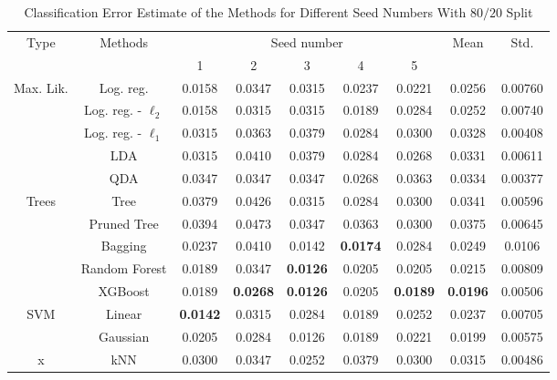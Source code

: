 \begin{table}[htb]
	\caption{Classification Error Estimate of the Methods for Different Seed Numbers With $80/20$ Split}
	\begin{center}
		\begin{tabular}{@{} c c c  c c c c c c @{}}\toprule
			\multirow{2}{*}{Type} & \multirow{2}{*}{Methods} &  \multicolumn{5}{c}{Seed number}
			& 	\multirow{2}{*}{Mean} & \multirow{2}{*}{Std.} \\
			& & 1 & 2 & 3 & 4 & 5 & & \\
			\midrule
			\multirow{5}{*}{Max. Lik.} & Log. reg. & \num{0.0158} & \num{0.0347} & \num{0.0315} & \num{0.0237} & \num{0.0221} & \num{0.0256} & \num{0.00760} \\
			& Log. reg. - $\ell_2$ & \num{0.0158} & \num{0.0315} & \num{0.0315} & \num{0.0189} & \num{0.0284} & \num{0.0252} & \num{0.00740}\\
			& Log. reg. - $\ell_1$ & \num{0.0315} & \num{0.0363} & \num{0.0379} & \num{0.0284} & \num{0.0300} & \num{0.0328} & \num{0.00408}\\
			& LDA & \num{0.0315} & \num{0.0410} & \num{0.0379} & \num{0.0284} & \num{0.0268} & \num{0.0331} & \num{0.00611}\\
			& QDA & \num{0.0347} & \num{0.0347} & \num{0.0347} & \num{0.0268} & \num{0.0363} & \num{0.0334} & \num{0.00377}\\
			\cmidrule{1-9}
			\multirow{5}{*}{Trees} & Tree & \num{0.0379} & \num{0.0426} & \num{0.0315} & \num{0.0284} & \num{0.0300} &  \num{0.0341} & \num{0.00596}\\
			& Pruned Tree & \num{0.0394} & \num{0.0473} & \num{0.0347} & \num{0.0363} & \num{0.0300} & \num{0.0375} & \num{0.00645}\\  
			& Bagging & \num{0.0237} & \num{0.0410} & \num{0.0142} & \textbf{\num{0.0174}} & \num{0.0284} & \num{0.0249} & \num{0.0106}\\
			& Random Forest & \num{0.0189} & \num{0.0347} & \textbf{\num{0.0126}} & \num{0.0205} & \num{0.0205} & \num{0.0215}  & \num{0.00809}\\
			& XGBoost & \num{0.0189} & \textbf{\num{0.0268}} & \textbf{\num{0.0126}} & \num{0.0205} & \textbf{\num{0.0189}} & \textbf{\num{0.0196}}  & \num{0.00506}\\
			\cmidrule{1-9}
			\multirow{2}{*}{SVM} & Linear & \textbf{\num{0.0142}} & \num{0.0315} & \num{0.0284} & \num{0.0189} & \num{0.0252} & \num{0.0237}  & \num{0.00705}\\
			& Gaussian & \num{0.0205} & \num{0.0284} & \num{0.0126} & \num{0.0189} & \num{0.0221} & \num{0.0199} & \num{0.00575}\\
			\cmidrule{1-9}
			x & kNN & \num{0.0300} & \num{0.0347} & \num{0.0252} & \num{0.0379} & \num{0.0300}& \num{0.0315}  & \num{0.00486} \\
			\bottomrule
			\end{tabular}
			\end{center}
			\label{tab_res_naive}
\end{table}

